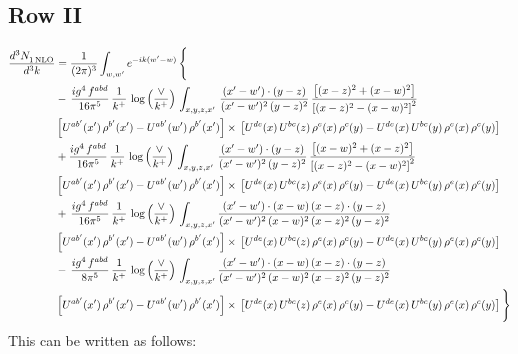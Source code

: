 \documentclass[9pt]{article}
\numberwithin{equation}{section}
\begin{document}
\subsection{Row II}
\begin{align}
\frac{d^{3}N_{1\,\rm NLO}^{\rm}}{d^{3}k}  & =  \frac{1}{(2\pi)^{3}}  \int_{w, w^\prime} e^{-ik(w^\prime-w)}\, \Bigg\{\notag \\
& -\,\frac{ig^{4}\,f^{abd}}{16\pi^{5}}\,\frac{1}{k^{+}}\,\log{\left(\frac{\vee}{k^{+}}\right)}\,\int_{x,y,z,x'}\, \frac{(x'-w')\cdot (y-z)}{(x'-w')^{2}\,(y-z)^{2}}\,\frac{\left[(x-z)^{2}+(x-w)^{2}\right]}{\left[(x-z)^{2}-(x-w)^{2}\right]^{2}}\notag \\ & \left[U^{ab'}(x')\,\rho^{b'}(x')-U^{ab'}(w')\, \rho^{b'}(x')\right]\times\, \left[U^{de}(x)\,U^{bc}(z)\, \rho^{e}(x)\,\rho^{c}(y)-U^{de}(x)\,U^{bc}(y)\,\rho^{e}(x)\,\rho^{c}(y)\right] \notag \\
&  +\frac{ig^{4}\,f^{abd}}{16\pi^{5}}\, \frac{1}{k^{+}}\,\log{\left(\frac{\vee}{k^{+}}\right)}\,\int_{x,y,z,x'}\, \frac{(x'-w')\cdot (y-z)}{(x'-w')^{2}\,(y-z)^{2}}\, \frac{\left[(x-w)^{2}+(x-z)^{2}\right]}{\left[(x-z)^{2}-(x-w)^{2}\right]^{2}}\notag \\ & \left[U^{ab'}(x')\,\rho^{b'}(x')-U^{ab'}(w')\, \rho^{b'}(x')\right]\times\, \left[U^{de}(x)\,U^{bc}(z)\, \rho^{e}(x)\,\rho^{c}(y)-U^{de}(x)\,U^{bc}(y)\,\rho^{e}(x)\,\rho^{c}(y)\right] \notag \\
& +\, \frac{ig^{4}\,f^{abd}}{16\pi^{5}}\,\frac{1}{k^{+}}\,\log{\left(\frac{\vee}{k^{+}}\right)}\,\int_{x,y,z,x'} \frac{(x'-w')\cdot (x-w)\, (x-z)\cdot (y-z)}{(x'-w')^{2}\, (x-w)^{2}\, (x-z)^{2}\, (y-z)^{2}}\, \notag \\ & \left[U^{ab'}(x')\,\rho^{b'}(x')-U^{ab'}(w')\, \rho^{b'}(x')\right]\times\, \left[U^{de}(x)\,U^{bc}(z)\, \rho^{e}(x)\,\rho^{c}(y)-U^{de}(x)\,U^{bc}(y)\,\rho^{e}(x)\,\rho^{c}(y)\right] \notag \\
&-\, \frac{ig^{4}\,f^{abd}}{8\pi^{5}}\,\frac{1}{k^{+}}\,\log{\left(\frac{\vee}{k^{+}}\right)} \,\int_{x,y,z,x'}\frac{(x'-w')\cdot (x-w)\, (x-z)\cdot (y-z)}{(x'-w')^{2}\, (x-w)^{2}\, (x-z)^{2}\, (y-z)^{2}}\notag \\ & \left[U^{ab'}(x')\,\rho^{b'}(x')-U^{ab'}(w')\, \rho^{b'}(x')\right]\times\, \left[U^{de}(x)\,U^{bc}(z)\, \rho^{e}(x)\,\rho^{c}(y)-U^{de}(x)\,U^{bc}(y)\,\rho^{e}(x)\,\rho^{c}(y)\right]\Bigg\}
\end{align}
This can be written as follows: 
\end{document}
